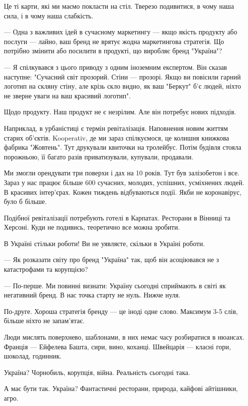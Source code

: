 Це ті карти, які ми маємо покласти на стіл. Тверезо подивитися, в чому наша
сила, і в чому наша слабкість.

--- Одна з важливих ідей в сучасному маркетингу --- якщо якість продукту або
послуги --- лайно, ваш бренд не врятує жодна маркетингова стратегія. Що потрібно
змінити або посилити в продукті, що виробляє бренд "Україна"?

--- Я спілкувався з цього приводу з одним іноземним експертом. Він сказав
наступне: "Сучасний світ прозорий. Стіни --- прозорі. Якщо ви повісили гарний
логотип на скляну стіну, але крізь скло видно, як ваш "Беркут" б’є людей, ніхто
не зверне уваги на ваш красивий логотип".

Щодо продукту. Наш продукт не є незрілим. Але він потребує нових підходів.

Наприклад, в урбаністиці є термін ревіталізація. Наповнення новим життям старих
об’єктів. Kooperativ, де ми зараз спілкуємося, це колишня книжкова фабрика
"Жовтень". Тут друкували квиточки на тролейбус. Потім будівля стояла порожньою,
її багато разів приватизували, купували, продавали. 

Ми змогли орендувати три поверхи і дах на 10 років. Тут був залізобетон і все.
Зараз у нас працює більше 600 сучасних, молодих, успішних, усміхнених людей. В
красивих інтер’єрах. Кожен тиждень відбуваються події. Якби не коронавірус,
було б більше.

Подібної ревіталізації потребують готелі в Карпатах. Ресторани в Вінниці та
Херсоні. Куди не подивись, теоретично все можна зробити.

В Україні стільки роботи! Ви не уявляєте, скільки в Україні роботи. 

--- Як розказати світу про бренд "Україна" так, щоб він асоціювався не з
катастрофами та корупцією?

--- По-перше. Ми повинні визнати: Україну сьогодні сприймають в світі як
негативний бренд. В нас точка старту не нуль. Нижче нуля.

По-друге. Хороша стратегія бренду --- це іноді одне слово. Максимум 3-5 слів,
більше ніхто не запам’ятає.

Люди мислять поверхнево, шаблонами, в них немає часу розбиратися в нюансах.
Франція --- Ейфелева Башта, сири, вино, коханці. Швейцарія --- класні гори,
шоколад, годинник.

Україна? Чорнобиль, корупція, війна. Реальність сьогодні така. 

А має бути так. Україна? Фантастичні ресторани, природа, кайфові айтішники,
агро. 

